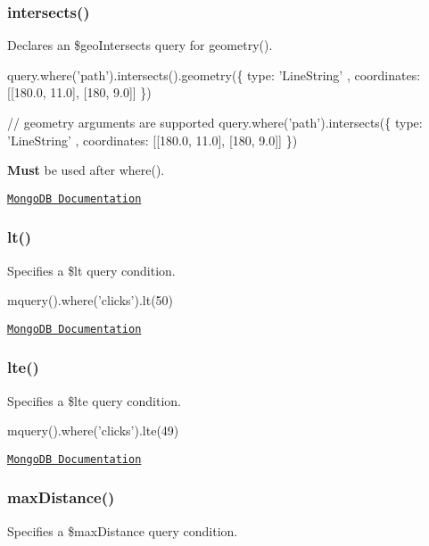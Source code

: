 \subsubsection*{intersects()}

Declares an {\ttfamily \$geo\+Intersects} query for {\ttfamily geometry()}.


\begin{DoxyCode}
query.where('path').intersects().geometry(\{
    type: 'LineString'
  , coordinates: [[180.0, 11.0], [180, 9.0]]
\})

// geometry arguments are supported
query.where('path').intersects(\{
    type: 'LineString'
  , coordinates: [[180.0, 11.0], [180, 9.0]]
\})
\end{DoxyCode}


{\bfseries Must} be used after {\ttfamily where()}.

\href{http://docs.mongodb.org/manual/reference/operator/geoIntersects/}{\tt Mongo\+DB Documentation}

\subsubsection*{lt()}

Specifies a {\ttfamily \$lt} query condition.


\begin{DoxyCode}
mquery().where('clicks').lt(50)
\end{DoxyCode}


\href{http://docs.mongodb.org/manual/reference/operator/lt/}{\tt Mongo\+DB Documentation}

\subsubsection*{lte()}

Specifies a {\ttfamily \$lte} query condition.


\begin{DoxyCode}
mquery().where('clicks').lte(49)
\end{DoxyCode}


\href{http://docs.mongodb.org/manual/reference/operator/lte/}{\tt Mongo\+DB Documentation}

\subsubsection*{max\+Distance()}

Specifies a {\ttfamily \$max\+Distance} query condition.


